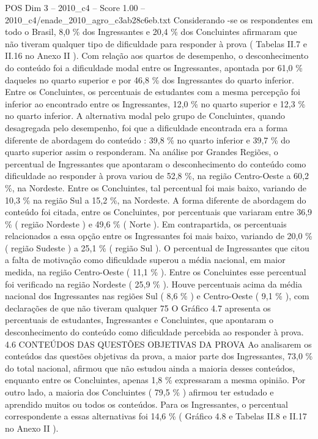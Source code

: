 \begin{textsample}{POS Dim 3 – 2010\_c4 – Score 1.00 – 2010\_c4/enade\_2010\_agro\_c3ab28c6eb.txt}
Considerando -se os respondentes em todo o Brasil, 8,0 \% dos Ingressantes e 20,4 \% dos Concluintes afirmaram que não tiveram qualquer tipo de dificuldade para responder à prova ( Tabelas II.7 e II.16 no Anexo II ).
Com relação aos quartos de desempenho, o desconhecimento do conteúdo foi a dificuldade modal entre os Ingressantes, apontada por 61,0 \% daqueles no quarto superior e por 46,8 \% dos Ingressantes do quarto inferior.
Entre os Concluintes, os percentuais de estudantes com a mesma percepção foi inferior ao encontrado entre os Ingressantes, 12,0 \% no quarto superior e 12,3 \% no quarto inferior.
A alternativa modal pelo grupo de Concluintes, quando desagregada pelo desempenho, foi que a dificuldade encontrada era a forma diferente de abordagem do conteúdo : 39,8 \% no quarto inferior e 39,7 \% do quarto superior assim o responderam.
Na análise por Grandes Regiões, o percentual de Ingressantes que apontaram o desconhecimento do conteúdo como dificuldade ao responder à prova variou de 52,8 \%, na região Centro-Oeste a 60,2 \%, na Nordeste.
Entre os Concluintes, tal percentual foi mais baixo, variando de 10,3 \% na região Sul a 15,2 \%, na Nordeste.
A forma diferente de abordagem do conteúdo foi citada, entre os Concluintes, por percentuais que variaram entre 36,9 \% ( região Nordeste ) e 49,6 \% ( Norte ).
Em contrapartida, os percentuais relacionados a essa opção entre os Ingressantes foi mais baixo, variando de 20,0 \% ( região Sudeste ) a 25,1 \% ( região Sul ).
O percentual de Ingressantes que citou a falta de motivação como dificuldade superou a média nacional, em maior medida, na região Centro-Oeste ( 11,1 \% ).
Entre os Concluintes esse percentual foi verificado na região Nordeste ( 25,9 \% ).
Houve percentuais acima da média nacional dos Ingressantes nas regiões Sul ( 8,6 \% ) e Centro-Oeste ( 9,1 \% ), com declarações de que não tiveram qualquer 75 O Gráfico 4.7 apresenta os percentuais de estudantes, Ingressantes e Concluintes, que apontaram o desconhecimento do conteúdo como dificuldade percebida ao responder à prova. 4.6 CONTEÚDOS DAS QUESTÕES OBJETIVAS DA PROVA Ao analisarem os conteúdos das questões objetivas da prova, a maior parte dos Ingressantes, 73,0 \% do total nacional, afirmou que não estudou ainda a maioria desses conteúdos, enquanto entre os Concluintes, apenas 1,8 \% expressaram a mesma opinião.
Por outro lado, a maioria dos Concluintes ( 79,5 \% ) afirmou ter estudado e aprendido muitos ou todos os conteúdos.
Para os Ingressantes, o percentual correspondente a essas alternativas foi 14,6 \% ( Gráfico 4.8 e Tabelas II.8 e II.17 no Anexo II ).

\end{textsample}
